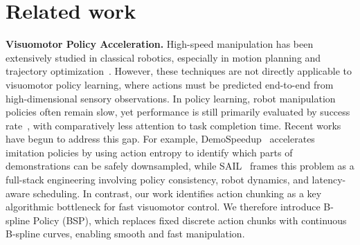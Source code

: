 

\vspace{-7pt}
\section{Related work}
\vspace{-3pt}


\textbf{Visuomotor Policy Acceleration.}
High-speed manipulation has been extensively studied in classical robotics, especially in motion planning and trajectory optimization~\cite{cmu-motion-plan-jeff}.
%
However, these techniques are not directly applicable to visuomotor policy learning, where actions must be predicted end-to-end from high-dimensional sensory observations.
%
In policy learning, robot manipulation policies often remain slow, yet performance is still primarily evaluated by success rate~\cite{pi_05, bidex, via, dp, manip_as_in_sim}, with comparatively less attention to task completion time.
%
Recent works~\cite{rtc, demospeedup, arachchige2025sail} have begun to address this gap. For example, DemoSpeedup~\cite{demospeedup} accelerates imitation policies by using action entropy to identify which parts of demonstrations can be safely downsampled, while SAIL~\cite{arachchige2025sail} frames this problem as a full-stack engineering involving policy consistency, robot dynamics, and latency-aware scheduling.
%
In contrast, our work identifies action chunking as a key algorithmic bottleneck for fast visuomotor control. We therefore introduce B-spline Policy (BSP), which replaces fixed discrete action chunks with continuous B-spline curves, enabling smooth and fast manipulation.



